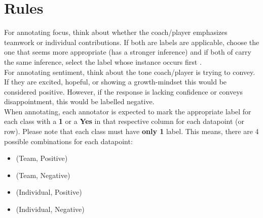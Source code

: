 \documentclass[titlepage]{article}
\begin{document}
\section{Rules}
For annotating focus, think about whether the coach/player emphasizes teamwork or individual contributions. If both are labels are applicable,
choose the one that seems more appropriate (has a stronger inference) and if both of carry the same inference, select
the label whose instance occurs first . \\

For annotating sentiment, think about the tone coach/player is trying to convey. If they are excited, hopeful, or showing a 
growth-mindset this would be considered positive. However, if the response is lacking confidence or conveys disappointment, 
this would be labelled negative. \\

When annotating, each annotator is expected to mark the appropriate label for each class with a \textbf{1} or 
a \textbf{Yes} in that respective column for each datapoint (or row). Please note that each class must have 
\textbf{only 1} label. This means, there are 4 possible combinations for each datapoint:
\begin{itemize}
    \item (Team, Positive)
    \item (Team, Negative)
    \item (Individual, Positive)
    \item (Individual, Negative)
\end{itemize}
\end{document}
